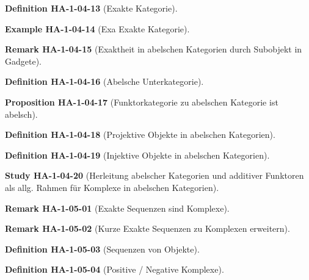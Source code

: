 \documentclass[10pt, letterpaper]{article}
\newcommand{\CustomHeading}[3]{%
  \par\medskip\noindent%
  \textbf{#1 #2} \textnormal{(#3)}.\enskip%
}
\newenvironment{DEF}[2]{\CustomHeading{Definition}{#1}{#2}}{}
\newenvironment{PROP}[2]{\CustomHeading{Proposition}{#1}{#2}}{}
\newenvironment{REM}[2]{\CustomHeading{Remark}{#1}{#2}}{}
\newenvironment{EXA}[2]{\CustomHeading{Example}{#1}{#2}}{}
\newenvironment{STUD}[2]{\CustomHeading{Study}{#1}{#2}}{}
\begin{document}
\begin{DEF}{HA-1-04-13}{Exakte Kategorie}
\end{DEF}

\begin{EXA}{HA-1-04-14}{Exa Exakte Kategorie}
\end{EXA}

\begin{REM}{HA-1-04-15}{Exaktheit in abelschen Kategorien durch Subobjekt in Gadgete}
\end{REM}

\begin{DEF}{HA-1-04-16}{Abelsche Unterkategorie}
\end{DEF}

\begin{PROP}{HA-1-04-17}{Funktorkategorie zu abelschen Kategorie ist abelsch}
\end{PROP}

\begin{DEF}{HA-1-04-18}{Projektive Objekte in abelschen Kategorien}
\end{DEF}

\begin{DEF}{HA-1-04-19}{Injektive Objekte in abelschen Kategorien}
\end{DEF}

\begin{STUD}{HA-1-04-20}{Herleitung abelscher Kategorien und additiver Funktoren als allg. Rahmen für Komplexe in abelschen Kategorien}
\end{STUD}

\begin{REM}{HA-1-05-01}{Exakte Sequenzen sind Komplexe}
\end{REM}

\begin{REM}{HA-1-05-02}{Kurze Exakte Sequenzen zu Komplexen erweitern}
\end{REM}

\begin{DEF}{HA-1-05-03}{Sequenzen von Objekte}
\end{DEF}

\begin{DEF}{HA-1-05-04}{Positive / Negative Komplexe}
\end{DEF}
\end{document}
